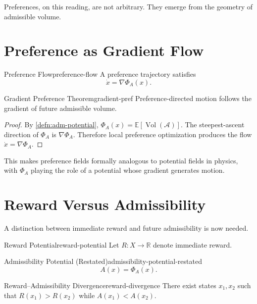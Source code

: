 \documentclass[12pt,twoside,openright]{book}
\newcommand{\adm}{\mathcal{A}}
\newcommand{\Vol}{\operatorname{Vol}}
\begin{document}
Preferences, on this reading, are not arbitrary. They
emerge from the geometry of admissible volume.

\section{Preference as Gradient Flow}
\label{sec:ch22-gradient}

\begin{definition}{Preference Flow}{preference-flow}
  A preference trajectory satisfies
  \[
    \dot{x} = \nabla\Phi_A(x).
  \]
\end{definition}

\begin{theorem}{Gradient Preference Theorem}{gradient-pref}
  Preference-directed motion follows the gradient of future
  admissible volume.
\end{theorem}

\begin{proof}
  By \cref{defn:adm-potential}, $\Phi_A(x) = \mathbb{E}[\Vol(\adm)]$.
  The steepest-ascent direction of $\Phi_A$ is $\nabla\Phi_A$.
  Therefore local preference optimization produces the flow
  $\dot{x} = \nabla\Phi_A$.
\end{proof}

This makes preference fields formally analogous to
potential fields in physics, with $\Phi_A$ playing the role
of a potential whose gradient generates motion.

\section{Reward Versus Admissibility}
\label{sec:ch22-divergence}

A distinction between immediate reward and future
admissibility is now needed.

\begin{definition}{Reward Potential}{reward-potential}
  Let $R : X \to \mathbb{R}$ denote immediate reward.
\end{definition}

\begin{definition}{Admissibility Potential (Restated)}{admissibility-potential-restated}
  \[
    A(x) = \Phi_A(x).
  \]
\end{definition}

\begin{theorem}{Reward--Admissibility Divergence}{reward-divergence}
  There exist states $x_1, x_2$ such that
  $R(x_1) > R(x_2)$ while $A(x_1) < A(x_2)$.
\end{theorem}
\end{document}
